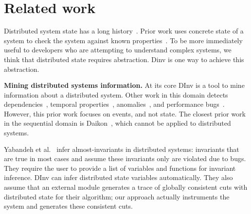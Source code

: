 \section{Related work}
\label{sec:related}


Distributed system state has a long
history~\cite{dist_snapshots_Chandy1985,
  state_machine_replication_Schneider1990,
  geels_friday_nsdi_2007}. Prior work uses concrete state of a system
to check the system against known properties~\cite{yang_modist_nsdi09,
  killian_macemc_nsdi_2007}. To be more immediately useful to
developers who are attempting to understand complex systems, we think
that distributed state requires abstraction. Dinv is one way to
achieve this abstraction.

\textbf{Mining distributed systems information.}
%
At its core DInv is a tool to mine information about a distributed system.
Other work in this domain detects
dependencies~\cite{lou_mining_distsys_deps_osr_2010}, temporal
properties~\cite{Beschastnikh2012},
anomalies~\cite{xu_console_log_mining_sosp_2009}, and performance
bugs~\cite{Sambasivan11}. However, this prior work focuses on events,
and not state. The closest prior work in the sequential domain is
Daikon~\cite{Ernst07}, which cannot be applied to distributed systems.

Yabandeh et al.~\cite{yabandeh_avenger_srds_2011} infer
almost-invariants in distributed systems: invariants that are true in
most cases and assume these invariants only are violated due to
bugs. They require the user to provide a list of variables and
functions for invariant inference. DInv can infer distributed state
variables automatically. They also assume that an external module
generates a trace of globally consistent cuts with distributed state
for their algorithm; our approach actually instruments the system and
generates these consistent cuts.


